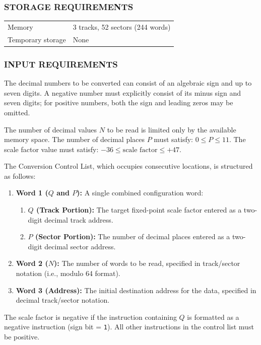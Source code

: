 \subsubsection*{STORAGE REQUIREMENTS}
\begin{center}
\begin{tabular}{ll}
    \toprule
    Memory & 3 tracks, 52 sectors (244 words) \\
    Temporary storage    & None \\
    \bottomrule
\end{tabular}
\end{center}

\subsubsection*{INPUT REQUIREMENTS}
The decimal numbers to be converted can consist of an algebraic sign and up to seven digits. A negative number must explicitly consist of its minus sign and seven digits; for positive numbers, both the sign and leading zeros may be omitted.

The number of decimal values $N$ to be read is limited only by the available memory space. The number of decimal places $P$ must satisfy: $0 \le P \le 11$. The scale factor value must satisfy: $-36 \le \text{scale factor} \le +47$.

The Conversion Control List, which occupies consecutive locations, is structured as follows:
\begin{enumerate}
    \item \textbf{Word 1 ($Q$ and $P$):} A single combined configuration word:
    \begin{enumerate}
        \item \textbf{$Q$ (Track Portion):} The target fixed-point scale factor entered as a two-digit decimal track address.
        \item \textbf{$P$ (Sector Portion):} The number of decimal places entered as a two-digit decimal sector address.
    \end{enumerate}
    \item \textbf{Word 2 ($N$):} The number of words to be read, specified in track/sector notation (i.e., modulo 64 format).
    \item \textbf{Word 3 (Address):} The initial destination address for the data, specified in decimal track/sector notation.
\end{enumerate}

The scale factor is negative if the instruction containing $Q$ is formatted as a negative instruction (sign bit = \texttt{1}). All other instructions in the control list must be positive.

